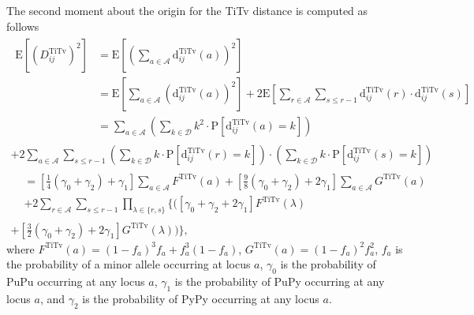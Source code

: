 \documentclass[aoas]{imsart}
\begin{document}
The second moment about the origin for the TiTv distance is computed as follows
%
\begin{equation}\label{eq:mu2_DDistr_TiTv}
\begin{split}
\begin{aligned}
\text{E}\left[\left(D^\text{TiTv}_{ij}\right)^2\right] &= \text{E}\left[\left(\sum_{a \in \mathcal{A}} \text{d}^\text{TiTv}_{ij}(a)\right)^2\right] \\
&= \text{E}\left[\sum_{a \in \mathcal{A}} \left(\text{d}^\text{TiTv}_{ij}(a)\right)^2\right] + 2 \text{E}\left[\sum_{r \in \mathcal{A}} \sum_{s \leq r - 1} \text{d}^\text{TiTv}_{ij}(r) \cdot \text{d}^\text{TiTv}_{ij}(s)\right] \\
&= \sum_{a \in \mathcal{A}} \left(\sum_{k \in \mathcal{D}} k^2 \cdot \text{P}\left[\text{d}^\text{TiTv}_{ij}(a) = k\right]\right)
\end{aligned}\\
+ 2\sum_{a \in \mathcal{A}} \sum_{s \leq r - 1} \left(\sum_{k \in \mathcal{D}} k \cdot \text{P}\left[\text{d}^\text{TiTv}_{ij}(r) = k\right]\right) \cdot \left(\sum_{k \in \mathcal{D}} k \cdot \text{P}\left[\text{d}^\text{TiTv}_{ij}(s) = k\right]\right) \\
\begin{aligned}
&= \left[\frac{1}{4}(\gamma_0 + \gamma_2) + \gamma_1\right] \sum_{a \in \mathcal{A}} F^\text{TiTv}(a) + \left[\frac{9}{8}(\gamma_0 + \gamma_2) + 2\gamma_1\right] \sum_{a \in \mathcal{A}} G^\text{TiTv}(a) \\
&+ 2 \sum_{r \in \mathcal{A}} \sum_{s \leq r - 1} \prod_{\lambda \in \{r,s\}} {\Biggl\{}{\biggl(}[\gamma_0 + \gamma_2 + 2\gamma_1] F^\text{TiTv}(\lambda) 
\end{aligned}\\
+ \left[\frac{3}{2}(\gamma_0 + \gamma_2) + 2\gamma_1\right] G^\text{TiTv}(\lambda){\biggr)}{\Biggr\}},
\end{split}
\end{equation}
%
where $F^\text{TiTv}(a) = (1 - f_a)^3 f_a + f^3_a (1 - f_a)$, $G^\text{TiTv}(a) = (1 - f_a)^2 f^2_a$, $f_a$ is the probability of a minor allele occurring at locus $a$, $\gamma_0$ is the probability of PuPu occurring at any locus $a$, $\gamma_1$ is the probability of PuPy occurring at any locus $a$, and $\gamma_2$ is the probability of PyPy occurring at any locus $a$.
\end{document}
